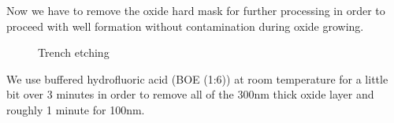 Now we have to remove the oxide hard mask for further processing in order to proceed with well formation without contamination during oxide growing.

\begin{figure}[H]
	\centering
	\begin{tikzpicture}[node distance = 3cm, auto, thick,scale=\CrossSectionOnly, every node/.style={transform shape}]
		
	\end{tikzpicture}
	\drawStepArrow{}
	\begin{tikzpicture}[node distance = 3cm, auto, thick,scale=\CrossSectionOnly, every node/.style={transform shape}]
		
	\end{tikzpicture}
	\caption{Trench etching}
\end{figure}

We use buffered hydrofluoric acid (BOE (1:6)) at room temperature for a little bit over 3 minutes in order to remove all of the 300nm thick oxide layer and roughly 1 minute for 100nm.

